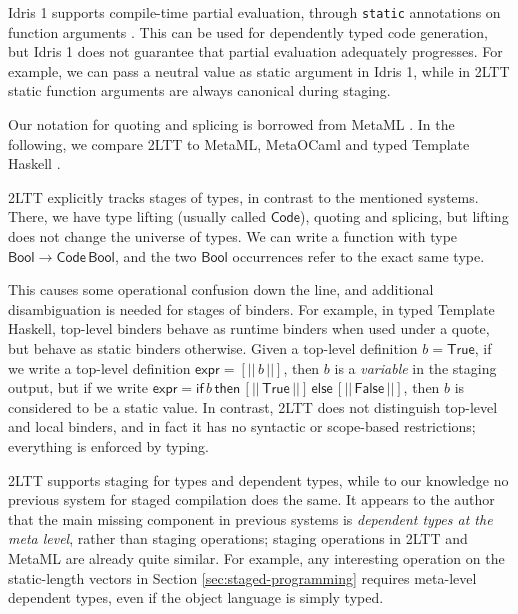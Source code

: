 \documentclass[acmsmall,review]{acmart}
\newcommand{\msf}[1]{\mathsf{#1}}
\newcommand{\Bool}{\msf{Bool}}
\newcommand{\True}{\msf{True}}
\newcommand{\False}{\msf{False}}
\theoremstyle{remark}
\begin{document}

Idris 1 supports compile-time partial evaluation, through \texttt{static}
annotations on function arguments \cite{scrap-your-inefficient-engine}. This can
be used for dependently typed code generation, but Idris 1 does not guarantee
that partial evaluation adequately progresses. For example, we can pass a neutral
value as static argument in Idris 1, while in 2LTT static function arguments
are always canonical during staging.

Our notation for quoting and splicing is borrowed from MetaML \cite{metaml}.  In
the following, we compare 2LTT to MetaML, MetaOCaml \cite{kiselyov14metaocaml}
and typed Template Haskell \cite{typed-th}.

2LTT explicitly tracks stages of types, in contrast to the mentioned
systems. There, we have type lifting (usually called $\msf{Code}$), quoting and
splicing, but lifting does not change the universe of types. We can write a
function with type $\Bool \to \msf{Code}\,\Bool$, and the two $\Bool$
occurrences refer to the exact same type.

This causes some operational confusion down the line, and additional
disambiguation is needed for stages of binders. For example, in typed Template
Haskell, top-level binders behave as runtime binders when used under a quote,
but behave as static binders otherwise. Given a top-level definition $b =
\True$, if we write a top-level definition $\msf{expr} = [||\,b\,||]$, then $b$
is a \emph{variable} in the staging output, but if we write $\msf{expr} =
\msf{if}\,b\,\msf{then}\,[||\,\True\,||]\,\msf{else}\,[||\,\False\,||]$, then
$b$ is considered to be a static value. In contrast, 2LTT does not distinguish
top-level and local binders, and in fact it has no syntactic or scope-based
restrictions; everything is enforced by typing.

2LTT supports staging for types and dependent types, while to our knowledge no
previous system for staged compilation does the same. It appears to the author
that the main missing component in previous systems is \emph{dependent types at
the meta level}, rather than staging operations; staging operations in 2LTT and
MetaML are already quite similar. For example, any interesting operation on
the static-length vectors in Section \ref{sec:staged-programming} requires
meta-level dependent types, even if the object language is simply typed.
\end{document}
